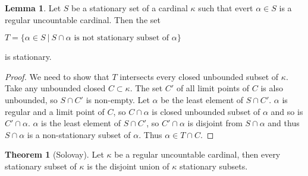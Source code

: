 \documentclass[8pt]{article}
\theoremstyle{definition}
\theoremstyle{definition}
\newtheorem{theorem}{Theorem}[section]
\theoremstyle{definition}
\theoremstyle{definition}
\theoremstyle{definition}
\theoremstyle{definition}
\theoremstyle{definition}
\theoremstyle{definition}
\newtheorem{lemma}{Lemma}[section]
\theoremstyle{definition}
\theoremstyle{definition}
\theoremstyle{definition}
\theoremstyle{definition}
\theoremstyle{definition}
\theoremstyle{definition}
\theoremstyle{question}
\begin{document}
\begin{lemma}
  Let $S$ be a stationary set of a cardinal $\kappa$ such that evert $\alpha \in S$ is a regular uncountable
  cardinal. Then the set
  \begin{center}
  $T = \{ \alpha \in S \: | \: \text{$S \cap \alpha$ is not stationary subset of $\alpha$} \}$
  \end{center}
  is stationary.
\end{lemma}

\begin{proof}
  We need to show that $T$ intersects every closed unbounded subset of $\kappa$. 
  Take any unbounded closed $C \subset \kappa$. The set $C'$ of all limit points of $C$ is also unbounded, 
  so $S \cap C'$ is non-empty. Let $\alpha$ be the least element of $S \cap C'$.
  $\alpha$ is regular and a limit point of $C$, so $C \cap \alpha$ is closed unbounded subset of $\alpha$ and so
  is $C' \cap \alpha$. $\alpha$ is the least element of $S \cap C'$, so $C' \cap \alpha$ is disjoint
  from $S \cap \alpha$ and thus $S \cap \alpha$ is a non-stationary subset of $\alpha$. Thus $\alpha \in T \cap C$.
\end{proof}

\begin{theorem}[Solovay]

  Let $\kappa$ be a regular uncountable cardinal, then every stationary subset of $\kappa$ is the disjoint union
  of $\kappa$ stationary subsets.
\end{theorem}
\end{document}
